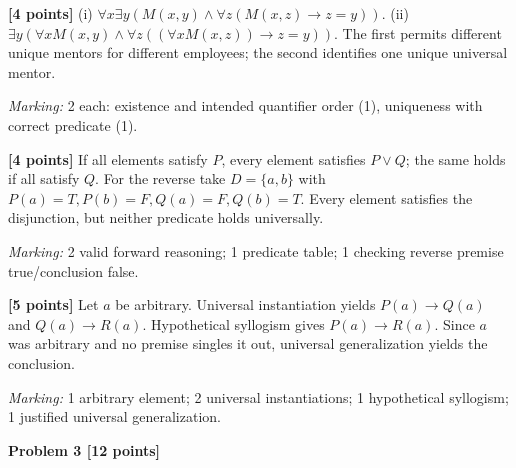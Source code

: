 \documentclass[12pt,letterpaper]{article}
\newcommand{\problemheading}[2][5\baselineskip]{\Needspace{#1}\par\noindent\hspace*{-0.625in}\textbf{#2}\par\nobreak\vspace{0.3em}}
\begin{document}
\begin{description}[font=\normalfont,leftmargin=1.2em,labelsep=0.4em]
\item[(a)] \textbf{[4 points]} (i) $\forall x\exists y(M(x,y)\land\forall z(M(x,z)\to z=y))$. (ii) $\exists y(\forall x M(x,y)\land\forall z((\forall x M(x,z))\to z=y))$. The first permits different unique mentors for different employees; the second identifies one unique universal mentor.
\par\textit{Marking:} 2 each: existence and intended quantifier order (1), uniqueness with correct predicate (1).
\item[(b)] \textbf{[4 points]} If all elements satisfy $P$, every element satisfies $P\lor Q$; the same holds if all satisfy $Q$. For the reverse take $D=\{a,b\}$ with $P(a)=T,P(b)=F,Q(a)=F,Q(b)=T$. Every element satisfies the disjunction, but neither predicate holds universally.
\par\textit{Marking:} 2 valid forward reasoning; 1 predicate table; 1 checking reverse premise true/conclusion false.
\item[(c)] \textbf{[5 points]} Let $a$ be arbitrary. Universal instantiation yields $P(a)\to Q(a)$ and $Q(a)\to R(a)$. Hypothetical syllogism gives $P(a)\to R(a)$. Since $a$ was arbitrary and no premise singles it out, universal generalization yields the conclusion.
\par\textit{Marking:} 1 arbitrary element; 2 universal instantiations; 1 hypothetical syllogism; 1 justified universal generalization.
\end{description}
\vspace{0.65em}
\problemheading[\dimexpr 3\baselineskip+4\baselineskip\relax]{Problem 3 [12 points]}
\end{document}
